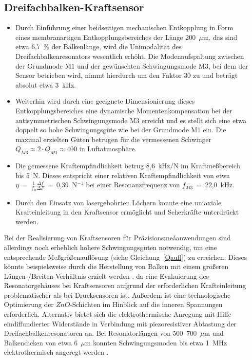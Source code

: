 \subsection{Dreifachbalken-Kraftsensor}
\begin{itemize}
\item
Durch Einführung einer beidseitigen mechanischen Entkopplung in Form eines
membranartigen Entkopplungsbereiches der Länge 200~$\mu$m, das sind etwa
6,7~\% der Balkenlänge, wird die Unimodalität des Dreifachbalkenresonators
wesentlich erhöht. Die Modenaufspaltung zwischen der Grundmode M1 und der
gewünschten Schwingungsmode M3, bei dem der Sensor betrieben wird, nimmt
hierdurch um den Faktor 30 zu und beträgt absolut etwa 3~kHz.
\item
Weiterhin wird durch eine geeignete Dimensionierung dieses
Entkopplungsbereiches eine dynamische Momentenkompensation bei der
antisymmetrischen Schwingungsmode M3 erreicht und es stellt sich eine etwa
doppelt so hohe Schwingungsgüte wie bei der Grundmode M1 ein.
Die maximal erzielten Güten betrugen für die vermessenen Schwinger
$Q_{M3} \approx 2 \cdot Q_{M1} \approx 400$ in Luftatmosphäre.
\item
Die gemessene Kraftempfindlichkeit betrug 8,6~kHz/N im
Kraftmeßbereich bis 5~N. Dieses entspricht einer relativen
Kraftempfindlichkeit von etwa
$\eta~=~\frac{1}{f_{0}}\frac{\Delta f}{\Delta F}$~=~0,39~N$^{-1}$
bei einer Resonanzfrequenz von $f_{M3}$~=~22,0~kHz.
\item
Durch den Einsatz von lasergebohrten Löchern konnte eine uniaxiale
Kraft\-einleitung in den Kraftsensor ermöglicht und Scherkräfte
unterdrückt werden.
\end{itemize}
Bei der Realisierung von Kraftsensoren für Präzisionsmeáanwendungen sind
allerdings noch erheblich höhere Schwingungsgüten notwendig, um eine
entsprechende Meßgrößenauflösung (siehe Gleichung~\ref{Qaufl}) zu erreichen.
Dieses
könnte beispielsweise durch die Herstellung von Balken mit einem größeren
Längen-/Breiten-Verhältnis erzielt werden \cite{Kir83}, da
eine Evakuierung des Resonatorgehäuses bei Kraftsensoren aufgrund der
erforderlichen Kraft\-einleitung problematischer als bei Drucksensoren ist.
Außerdem ist eine technologische Optimierung der $ZnO$-Schichten im Hinblick
auf die inneren Spannungen erforderlich. Alternativ bietet sich die
elektrothermische Anregung mit Hilfe eindiffundierter Widerstände in
Verbindung mit piezoresistiver Abtastung der Dreifachbalkenresonatoren
an. Bei Resonatorlängen von 500--700~$\mu$m und Balkendicken von etwa
6~$\mu$m konnten Schwingungsmoden bis etwa 1~MHz elektrothermisch angeregt
werden \cite{Bur93}.



